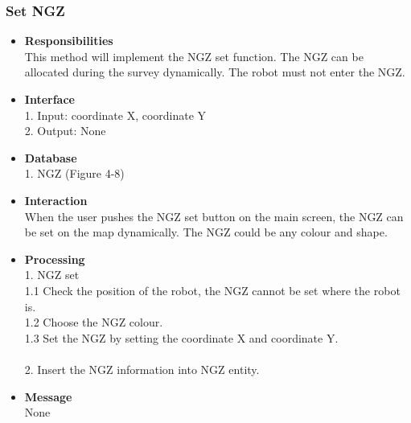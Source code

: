 \documentclass[11pt, a4paper]{article}
\begin{document}
\subsubsection{Set NGZ }
\begin{itemize}
\item {\bfseries Responsibilities }\\
This method will implement the NGZ set function. The NGZ can be allocated during the survey dynamically. The robot must not enter the NGZ.\\

\item {\bfseries Interface }\\
1. Input: coordinate X, coordinate Y\\
2. Output: None\\

\item {\bfseries Database }\\
1. NGZ (Figure 4-8)\\

\item {\bfseries Interaction }\\
When the user pushes the NGZ set button on the main screen, the NGZ can be set on the map dynamically. The NGZ could be any colour and shape.\\

\item {\bfseries Processing }\\
1. NGZ set\\
1.1 Check the position of the robot, the NGZ cannot be set where the robot is.\\
1.2 Choose the NGZ colour.\\
1.3 Set the NGZ by setting the coordinate X and coordinate Y.\\
\\
2. Insert the NGZ information into NGZ entity.\\

\item {\bfseries Message }\\
None
\end{itemize}

\end{document}
